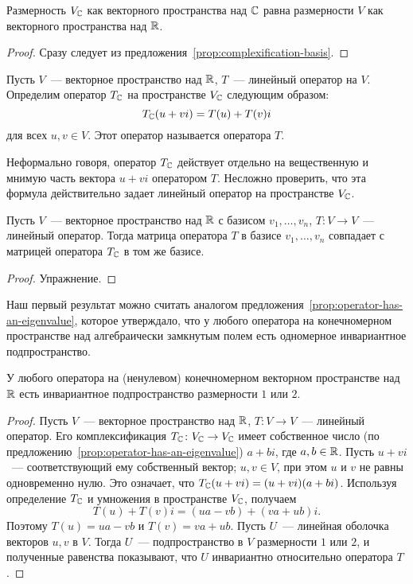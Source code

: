 \begin{corollary}\label{cor:complexification-dimension}
Размерность $V_\mathbb C$ как векторного пространства над $\mathbb C$ равна
размерности $V$ как векторного пространства над $\mathbb R$.
\end{corollary}
\begin{proof}
Сразу следует из предложения~\ref{prop:complexification-basis}.
\end{proof}

\begin{definition}
Пусть $V$~--- векторное пространство над $\mathbb R$, $T$~--- линейный оператор
на $V$. Определим оператор $T_\mathbb C$ на пространстве $V_\mathbb C$ следующим образом:
$$
T_\mathbb C(u+vi) = T(u) + T(v)i
$$
для всех $u,v\in V$. Этот оператор называется
 оператора $T$.
\end{definition}
Неформально говоря, оператор $T_\mathbb C$ действует отдельно на вещественную
и мнимую часть вектора $u+vi$ оператором $T$. Несложно проверить, что
эта формула действительно задает линейный оператор на пространстве $V_\mathbb C$.

\begin{lemma}
Пусть $V$~--- векторное пространство над $\mathbb R$ с базисом $v_1,\dots,v_n$,
$T\colon V\to V$~--- линейный оператор. Тогда матрица оператора $T$
в базисе $v_1,\dots,v_n$ совпадает с матрицей оператора $T_\mathbb C$ в том же
базисе.
\end{lemma}
\begin{proof}
Упражнение.
\end{proof}

Наш первый результат можно считать аналогом
предложения~\ref{prop:operator-has-an-eigenvalue}, которое утверждало,
что у любого оператора на конечномерном пространстве
над алгебраически замкнутым полем есть
одномерное инвариантное подпространство.

\begin{proposition}\label{prop:real-operator-invariant-subspace}
У любого оператора на (ненулевом) конечномерном векторном пространстве
над $\mathbb R$ есть инвариантное подпространство
размерности $1$ или $2$.
\end{proposition}
\begin{proof}
Пусть $V$~--- векторное пространство над $\mathbb R$, $T\colon V\to V$~---
линейный оператор. Его комплексификация $T_\mathbb C\colon V_\mathbb C\to V_\mathbb C$
имеет собственное число (по предложению~\ref{prop:operator-has-an-eigenvalue})
$a+bi$, где $a,b\in\mathbb R$. Пусть $u+vi$~--- соответствующий ему собственный
вектор; $u,v\in V$, при этом $u$ и $v$ не равны одновременно нулю.
Это означает, что $T_\mathbb C(u+vi) = (u+vi)(a+bi)$.
Используя определение $T_\mathbb C$ и умножения в пространстве $V_\mathbb C$, получаем
$$
T(u) + T(v)i = (ua-vb) + (va+ub)i.
$$
Поэтому $T(u) = ua-vb$ и $T(v) = va+ub$.
Пусть $U$~--- линейная оболочка векторов $u,v$ в $V$.
Тогда $U$~--- подпространство в $V$ размерности $1$ или $2$,
и полученные равенства показывают, что $U$ инвариантно относительно
оператора $T$.
\end{proof}

